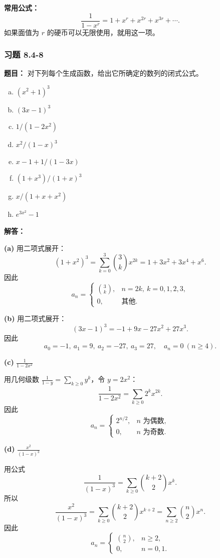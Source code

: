 \documentclass[11pt,UTF8]{article}
\begin{document}
\textbf{常用公式：}
\[ \frac{1}{1-x^r}=1+x^r+x^{2r}+x^{3r}+\cdots. \]
如果面值为 $r$ 的硬币可以无限使用，就用这一项。

\subsubsection*{习题 8.4-8}
\textbf{题目：} 对下列每个生成函数，给出它所确定的数列的闭式公式。
\begin{enumerate}[a)]
    \item $(x^2+1)^3$
    \item $(3x-1)^3$
    \item[(c)] $1/(1-2x^2)$
    \item[(d)] $x^2/(1-x)^3$
    \item[(e)] $x-1+1/(1-3x)$
    \item[(f)] $(1+x^3)/(1+x)^3$
    \item[(g)] $x/(1+x+x^2)$
    \item[(h)] $e^{3x^2}-1$
\end{enumerate}

\textbf{解答：}

\textbf{(a)} 用二项式展开：
\[ (1+x^2)^3=\sum_{k=0}^{3}\binom{3}{k}x^{2k}=1+3x^2+3x^4+x^6. \]
因此
\[ a_n=\begin{cases}
\displaystyle\binom{3}{k}, & n=2k,\ k=0,1,2,3,\\[6pt]
0, & \text{其他}.
\end{cases} \]

\textbf{(b)} 用二项式展开：
\[ (3x-1)^3=-1+9x-27x^2+27x^3. \]
因此
\[ a_0=-1,\ a_1=9,\ a_2=-27,\ a_3=27,\quad a_n=0\ (n\ge 4). \]

\textbf{(c)} $\displaystyle\frac{1}{1-2x^2}$

用几何级数 $\displaystyle\frac{1}{1-y}=\sum_{k\ge 0}y^k$，令 $y=2x^2$：
\[ \frac{1}{1-2x^2}=\sum_{k\ge 0}2^kx^{2k}. \]
因此
\[ a_n=\begin{cases}
2^{n/2}, & n\text{ 为偶数},\\[4pt]
0, & n\text{ 为奇数}.
\end{cases} \]

\textbf{(d)} $\displaystyle\frac{x^2}{(1-x)^3}$

用公式
\[ \frac{1}{(1-x)^3}=\sum_{k\ge 0}\binom{k+2}{2}x^k. \]
所以
\[ \frac{x^2}{(1-x)^3}=\sum_{k\ge 0}\binom{k+2}{2}x^{k+2}=\sum_{n\ge 2}\binom{n}{2}x^n. \]
因此
\[ a_n=\begin{cases}
\displaystyle\binom{n}{2}, & n\ge 2,\\[6pt]
0, & n=0,1.
\end{cases} \]
\end{document}
